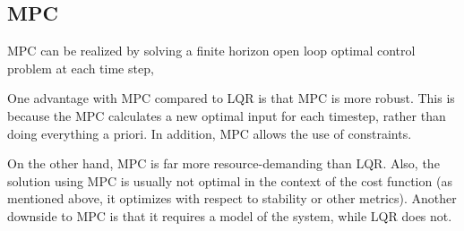 \subsection{MPC}
MPC can be realized by solving a finite horizon open loop optimal control problem at each time step, 


One advantage with MPC compared to LQR is that MPC is more robust. This is because the MPC calculates a new optimal input for each timestep, rather than doing everything a priori. In addition, MPC allows the use of constraints.

On the other hand, MPC is far more resource-demanding than LQR. Also, the solution using MPC is usually not optimal in the context of the cost function (as mentioned above, it optimizes with respect to stability or other metrics). Another downside to MPC is that it requires a model of the system, while LQR does not.
